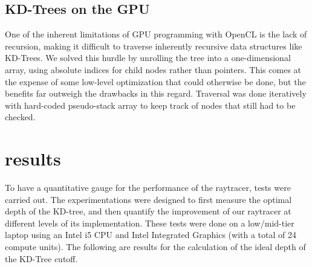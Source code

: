 \documentclass[letterpaper, 10 pt, conference]{ieeeconf}  %
\begin{document}
\subsection{KD-Trees on the GPU}
One of the inherent limitations of GPU programming with OpenCL is the lack of recursion, making it difficult to traverse inherently recursive data structures like KD-Trees. We solved this hurdle by unrolling the tree into a one-dimensional array, using absolute indices for child nodes rather than pointers. This comes at the expense of some low-level optimization that could otherwise be done, but the benefits far outweigh the drawbacks in this regard. Traversal was done iteratively with hard-coded pseudo-stack array to keep track of nodes that still had to be checked.

\section{results}
To have a quantitative gauge for the performance of the raytracer, tests were carried out. The experimentations were designed to first measure the optimal depth of the KD-tree, and then quantify the improvement of our raytracer at different levels of its implementation. These tests were done on a low/mid-tier laptop using an Intel i5 CPU and Intel Integrated Graphics (with a total of 24 compute units). The following are results for the calculation of the ideal depth of the KD-Tree cutoff.
\end{document}
